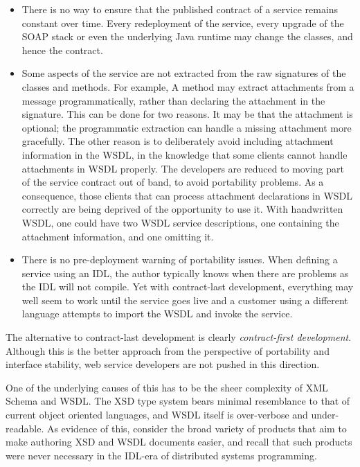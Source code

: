 \begin{itemize}

\item
    
There is no way to ensure that the published contract of a service
remains constant over time. Every redeployment of the service, every
upgrade of the SOAP stack or even the underlying Java runtime may
change the classes, and hence the contract.

\item

Some aspects of the service are not extracted from the raw signatures of the
classes and methods. For example, A method may extract attachments from a
message programmatically, rather than declaring the attachment in the signature.
This can be done for two reasons. It may be that the attachment is optional; the
programmatic extraction can handle a missing attachment more gracefully. The
other reason is to deliberately avoid including attachment information in the
WSDL, in the knowledge that some clients cannot handle attachments in WSDL
properly. The developers are reduced to moving part of the service contract out
of band, to avoid portability problems. As a consequence, those clients that can
process attachment declarations in WSDL correctly are being deprived of the
opportunity to use it. With handwritten WSDL, one could have two WSDL service
descriptions, one containing the attachment information, and one omitting it.

\item

There is no pre-deployment warning of portability issues.
When defining a service using an IDL, the author typically knows when
there are problems as the IDL will not compile. Yet with contract-last
development, everything may well seem to work until the service goes
live and a customer using a different language attempts to import the
WSDL and invoke the service.
    
\end{itemize}

The alternative to contract-last development is clearly \emph{contract-first
development}. Although this is the better approach from the perspective
of portability and interface stability, web service developers are not
pushed in this direction.

One of the underlying causes of this has to be the sheer complexity of
XML Schema and WSDL. The XSD type system bears minimal resemblance to
that of current object oriented languages, and WSDL itself is
over-verbose and under-readable. As evidence of this, consider the
broad variety of products that aim to make authoring XSD and WSDL
documents easier, and recall that such products were never necessary
in the IDL-era of distributed systems programming.

